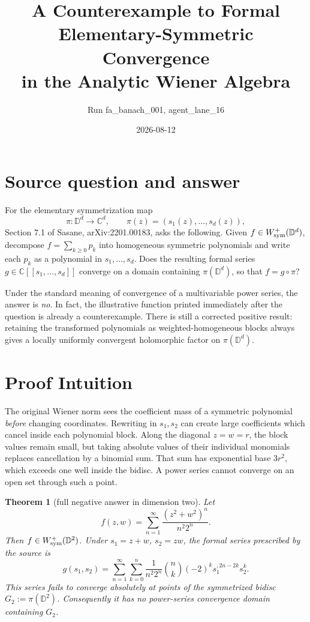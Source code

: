 \documentclass[11pt]{article}
\title{A Counterexample to Formal Elementary-Symmetric Convergence\\
in the Analytic Wiener Algebra}
\author{Run fa\_banach\_001, agent\_lane\_16}
\date{2026-08-12}
\newtheorem{theorem}{Theorem}
\newcommand{\D}{\mathbb D}
\newcommand{\C}{\mathbb C}
\begin{document}
\maketitle

\section*{Source question and answer}

For the elementary symmetrization map
\[
 \pi:\D^d\longrightarrow\C^d,
 \qquad \pi(z)=(s_1(z),\ldots,s_d(z)),
\]
Section 7.1 of Sasane, arXiv:2201.00183, asks the following.  Given
$f\in W^+_{\rm sym}(\D^d)$, decompose $f=\sum_{k\ge0}p_k$ into
homogeneous symmetric polynomials and write each $p_k$ as a polynomial
in $s_1,\ldots,s_d$.  Does the resulting formal series
$g\in\C[[s_1,\ldots,s_d]]$ converge on a domain
containing $\pi(\D^d)$, so that $f=g\circ\pi$?

Under the standard meaning of convergence of a multivariable power series,
the answer is \emph{no}.  In fact, the illustrative function printed
immediately after the question is already a counterexample.  There is still
a corrected positive result: retaining the transformed polynomials as
weighted-homogeneous blocks always gives a locally uniformly convergent
holomorphic factor on $\pi(\D^d)$.

\section*{Proof Intuition}

The original Wiener norm sees the coefficient mass of a symmetric polynomial
\emph{before} changing coordinates.  Rewriting in $s_1,s_2$ can create large
coefficients which cancel inside each polynomial block.  Along the diagonal
$z=w=r$, the block values remain small, but taking absolute values of their
individual monomials replaces cancellation by a binomial sum.  That sum has
exponential base $3r^2$, which exceeds one well inside the bidisc.  A power
series cannot converge on an open set through such a point.

\begin{theorem}[full negative answer in dimension two]\label{thm:counter}
Let
\begin{equation}\label{eq:f}
 f(z,w)=\sum_{n=1}^{\infty}\frac{(z^2+w^2)^n}{n^2 2^n}.
\end{equation}
Then $f\in W^+_{\rm sym}(\D^2)$.  Under $s_1=z+w$, $s_2=zw$, the
formal series prescribed by the source is
\begin{equation}\label{eq:g}
 g(s_1,s_2)=\sum_{n=1}^{\infty}\sum_{k=0}^n
 \frac{1}{n^2 2^n}\binom nk(-2)^k
 s_1^{,2n-2k}s_2^k.
\end{equation}
This series fails to converge absolutely at points of the symmetrized
bidisc $G_2:=\pi(\D^2)$.  Consequently it has no power-series convergence
domain containing $G_2$.
\end{theorem}
\end{document}
